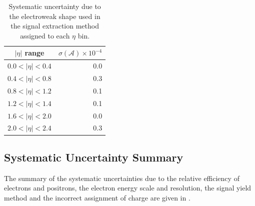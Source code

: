\begin{table}[htbp]
\begin{center}
\begin{tabular}{cr}
    \toprule
$|\eta|$ range & $\sigma(\mathcal{A}) \times 10^{-4}$\\
\midrule
$0.0<|\eta|<0.4$ & 0.0\\
$0.4<|\eta|<0.8$ & 0.3\\
$0.8<|\eta|<1.2$ & 0.1\\
$1.2<|\eta|<1.4$ & 0.1\\
$1.6<|\eta|<2.0$ & 0.0\\
$2.0<|\eta|<2.4$ & 0.3\\
    \bottomrule
\end{tabular}
\caption{\label{tab:systelectroweak}Systematic uncertainty due to the
electroweak \ETm shape used in the signal extraction method assigned to each
$\eta$ bin\cite{baisini2010electron}.}
\end{center}
\end{table}

\subsection{Systematic Uncertainty Summary}
The summary of the systematic uncertainties due to the relative efficiency of
electrons and positrons, the electron energy scale and resolution, the signal
yield method and the incorrect assignment of charge are given in
.

